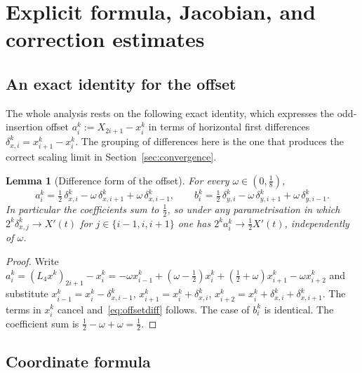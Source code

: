 \documentclass{article}
\theoremstyle{plain}
\newtheorem{lemma}[theorem]{Lemma}
\theoremstyle{definition}
\newcommand{\Lop}{L_4}
\begin{document}
\section{Explicit formula, Jacobian, and correction estimates}\label{sec:formula}

\subsection{An exact identity for the offset}

The whole analysis rests on the following exact identity, which expresses the
odd-insertion offset $a_i^k:=X_{2i+1}-x_i^k$ in terms of horizontal first
differences $\delta_{x,i}^k=x_{i+1}^k-x_i^k$. The grouping of differences here
is the one that produces the correct scaling limit in
Section~\ref{sec:convergence}.

\begin{lemma}[Difference form of the offset]\label{lem:offset}
For every $\omega\in(0,\tfrac18)$,
\begin{equation}\label{eq:offsetdiff}
  a_i^k = \tfrac12\,\delta_{x,i}^k
        - \omega\,\delta_{x,i+1}^k
        + \omega\,\delta_{x,i-1}^k,
  \qquad
  b_i^k = \tfrac12\,\delta_{y,i}^k
        - \omega\,\delta_{y,i+1}^k
        + \omega\,\delta_{y,i-1}^k.
\end{equation}
In particular the coefficients sum to $\tfrac12$, so under any parametrisation
in which $2^k\delta_{x,j}^k\to X'(t)$ for $j\in\{i-1,i,i+1\}$ one has
$2^k a_i^k\to\tfrac12 X'(t)$, \emph{independently of $\omega$}.
\end{lemma}

\begin{proof}
Write $a_i^k=(\Lop x^k)_{2i+1}-x_i^k
=-\omega x_{i-1}^k+(\omega-\tfrac12)x_i^k+(\tfrac12+\omega)x_{i+1}^k
-\omega x_{i+2}^k$ and substitute
$x_{i-1}^k=x_i^k-\delta_{x,i-1}^k$, $x_{i+1}^k=x_i^k+\delta_{x,i}^k$,
$x_{i+2}^k=x_i^k+\delta_{x,i}^k+\delta_{x,i+1}^k$. The terms in $x_i^k$ cancel
and~\eqref{eq:offsetdiff} follows. The case of $b_i^k$ is identical. The
coefficient sum is $\tfrac12-\omega+\omega=\tfrac12$.
\end{proof}

\subsection{Coordinate formula}
\end{document}
